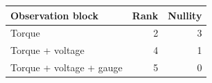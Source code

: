 \begin{tabular}{lrr}
\toprule
Observation block & Rank & Nullity\\
\midrule
Torque & 2 & 3\\
Torque + voltage & 4 & 1\\
Torque + voltage + gauge & 5 & 0\\
\bottomrule
\end{tabular}
